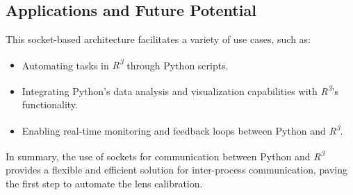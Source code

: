 \subsection{Applications and Future Potential}
\noindent This socket-based architecture facilitates a variety of use cases, such as:
\begin{itemize}
    \item Automating tasks in \textit{R\textsuperscript{3}} through Python scripts.
    \item Integrating Python's data analysis and visualization capabilities with \textit{R\textsuperscript{3}}'s functionality.
    \item Enabling real-time monitoring and feedback loops between Python and \textit{R\textsuperscript{3}}.
\end{itemize}

\noindent In summary, the use of sockets for communication between Python and \textit{R\textsuperscript{3}} provides a flexible and efficient solution for inter-process communication, paving the first step to automate the lens calibration.



